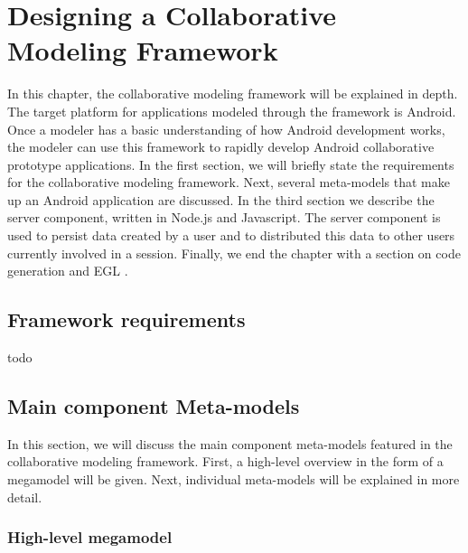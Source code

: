 \chapter{Designing a Collaborative Modeling Framework}

In this chapter, the collaborative modeling framework will be explained in depth. The target platform for applications modeled through the framework is Android. Once a modeler has a basic understanding of how Android development works, the modeler can use this framework to rapidly develop Android collaborative prototype applications. In the first section, we will briefly state the requirements for the collaborative modeling framework. Next, several meta-models that make up an Android application are discussed. In the third section we describe the server component, written in Node.js \cite{NodeJS} and Javascript. The server component is used to persist data created by a user and to distributed this data to other users currently involved in a session. Finally, we end the chapter with a section on code generation and EGL \cite{EGL}.

\section{Framework requirements}

todo

\section{Main component Meta-models}

In this section, we will discuss the main component meta-models featured in the collaborative modeling framework. First, a high-level overview in the form of a megamodel will be given. Next, individual meta-models will be explained in more detail.

\subsection{High-level megamodel}

